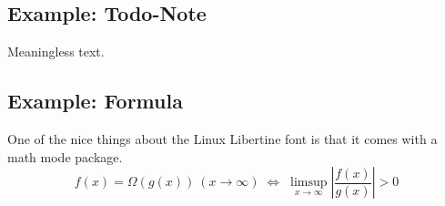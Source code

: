 \subsection{Example: Todo-Note}
Meaningless text.

\subsection{Example: Formula}
One of the nice things about the Linux Libertine font is that it comes with
a math mode package.
\begin{displaymath}
f(x)=\Omega(g(x))\ (x\rightarrow\infty)\;\Leftrightarrow\;
\limsup_{x \to \infty} \left|\frac{f(x)}{g(x)}\right|> 0
\end{displaymath}

